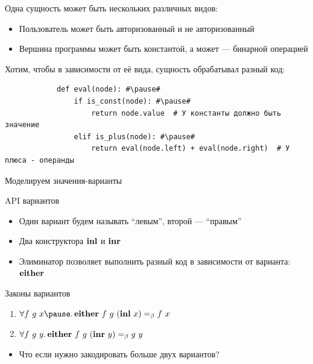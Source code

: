 
    \begin{frame}[fragile]{\subsecname}
        Одна сущность может быть нескольких различных видов:
        \begin{itemize}
            \item Пользователь может быть авторизованный и не авторизованный
            \item Вершина программы может быть константой, а может --- бинарной операцией
        \end{itemize}
        \pause
        \vspace{1em}
        Хотим, чтобы в зависимости от её вида, сущность обрабатывал разный код:
        \begin{verbatim}
            def eval(node): #\pause#
                if is_const(node): #\pause#
                    return node.value  # У константы должно быть значение
                elif is_plus(node): #\pause#
                    return eval(node.left) + eval(node.right)  # У плюса - операнды
        \end{verbatim}
    \end{frame}

    \begin{frame}[fragile]{Моделируем значения-варианты}
        \pause
        \begin{block}{API вариантов}
            \begin{itemize}
                \item Один вариант будем называть ``левым'', второй --- ``правым''
                \item Два конструктора $\mathbf{inl}$ и $\mathbf{inr}$
                \item Элиминатор позволяет выполнить разный код в зависимости от варианта: $\mathbf{either}$
            \end{itemize}
        \end{block}
        \pause
        \begin{block}{Законы вариантов}
            \begin{enumerate}
                \item $\forall f~g~x \pause \ldotp \term{either} \ap f \ap g \ap (\term{inl} \ap x) \eqbeta f \ap x$
                \item $\forall f~g~y \ldotp \mathbf{either} ~ f ~ g ~ (\mathbf{inr} ~ y) =_\beta g ~ y$
            \end{enumerate}
        \end{block}
        \pause
        \begin{itemize}
            \item[\todo] Что если нужно закодировать больше двух вариантов?
        \end{itemize}
    \end{frame}

